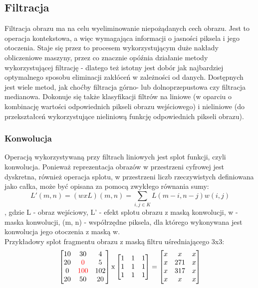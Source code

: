 \subsection{Filtracja}
Filtracja obrazu ma na celu wyeliminowanie niepożądanych cech obrazu. Jest to operacja kontekstowa, a więc wymagająca informacji o jasności piksela i jego otoczenia. Staje się przez to procesem wykorzystującym duże nakłady obliczeniowe maszyny, przez co znacznie opóźnia działanie metody wykorzystującej filtrację - dlatego też istotny jest dobór jak najbardziej optymalnego sposobu eliminacji zakłóceń w zależności od danych. Dostępnych jest wiele metod, jak choćby filtracja górno- lub dolnoprzepustowa czy filtracja medianowa. Dokonuje się także klasyfikacji filtrów na liniowe (w oparciu o kombinację wartości odpowiednich pikseli obrazu wejściowego) i nieliniowe (do przekształceń wykorzystujące nieliniową funkcję odpowiednich pikseli obrazu). 
\subsubsection{Konwolucja}
Operacją wykorzystywaną przy filtrach liniowych jest splot funkcji, czyli konwolucja. Ponieważ reprezentacja obrazów w przestrzeni cyfrowej jest dyskretna, również operacja splotu, w przestrzeni liczb rzeczywistych definiowana jako całka, może być opisana za pomocą zwykłego równania sumy:
\begin{equation}
\label{eq:konwolucja}
L'(m,n) = (w x L)(m,n) = \sum_{i,j \in K} L(m-i, n-j)w(i,j)
\end{equation}
, gdzie L - obraz wejściowy, L' - efekt splotu obrazu z maską konwolucji, w - maska konwolucji, (m, n) - współrzędne piksela, dla którego wykonywana jest konwolucja jego otoczenia z maską w.\\
Przykładowy splot fragmentu obrazu z maską filtru uśredniającego 3x3:
\label{eq:konwolucjaPrzyklad}
\[
\begin{bmatrix}
    10 & 30  & 4 \\
    20 & \textcolor{red}{0}   & 5 \\
    0  & \textcolor{red}{100} & 102 \\
    20 & 50  & 20
\end{bmatrix}
\mathrm{x}
\begin{bmatrix}
    1 & 1 & 1 \\
    1 & 1 & 1 \\
    1 & 1 & 1
\end{bmatrix}
=
\begin{bmatrix}
    x &  x  & x \\
    x & 271 & x \\
    x & 317 & x \\
    x &  x  & x 
\end{bmatrix}
\]
